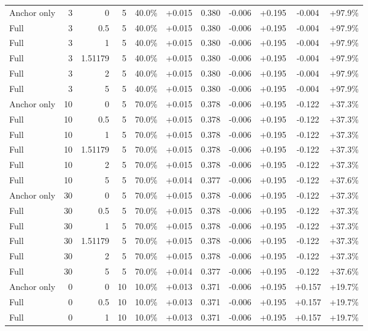 \begin{table}[htbp]
\begin{tabular}{lrrrccccccc}
Anchor only & 3 & 0 & 5 & 40.0\% & +0.015 & 0.380 & -0.006 & +0.195 & -0.004 & +97.9\% \\
Full & 3 & 0.5 & 5 & 40.0\% & +0.015 & 0.380 & -0.006 & +0.195 & -0.004 & +97.9\% \\
Full & 3 & 1 & 5 & 40.0\% & +0.015 & 0.380 & -0.006 & +0.195 & -0.004 & +97.9\% \\
Full & 3 & 1.51179 & 5 & 40.0\% & +0.015 & 0.380 & -0.006 & +0.195 & -0.004 & +97.9\% \\
Full & 3 & 2 & 5 & 40.0\% & +0.015 & 0.380 & -0.006 & +0.195 & -0.004 & +97.9\% \\
Full & 3 & 5 & 5 & 40.0\% & +0.015 & 0.380 & -0.006 & +0.195 & -0.004 & +97.9\% \\
Anchor only & 10 & 0 & 5 & 70.0\% & +0.015 & 0.378 & -0.006 & +0.195 & -0.122 & +37.3\% \\
Full & 10 & 0.5 & 5 & 70.0\% & +0.015 & 0.378 & -0.006 & +0.195 & -0.122 & +37.3\% \\
Full & 10 & 1 & 5 & 70.0\% & +0.015 & 0.378 & -0.006 & +0.195 & -0.122 & +37.3\% \\
Full & 10 & 1.51179 & 5 & 70.0\% & +0.015 & 0.378 & -0.006 & +0.195 & -0.122 & +37.3\% \\
Full & 10 & 2 & 5 & 70.0\% & +0.015 & 0.378 & -0.006 & +0.195 & -0.122 & +37.3\% \\
Full & 10 & 5 & 5 & 70.0\% & +0.014 & 0.377 & -0.006 & +0.195 & -0.122 & +37.6\% \\
Anchor only & 30 & 0 & 5 & 70.0\% & +0.015 & 0.378 & -0.006 & +0.195 & -0.122 & +37.3\% \\
Full & 30 & 0.5 & 5 & 70.0\% & +0.015 & 0.378 & -0.006 & +0.195 & -0.122 & +37.3\% \\
Full & 30 & 1 & 5 & 70.0\% & +0.015 & 0.378 & -0.006 & +0.195 & -0.122 & +37.3\% \\
Full & 30 & 1.51179 & 5 & 70.0\% & +0.015 & 0.378 & -0.006 & +0.195 & -0.122 & +37.3\% \\
Full & 30 & 2 & 5 & 70.0\% & +0.015 & 0.378 & -0.006 & +0.195 & -0.122 & +37.3\% \\
Full & 30 & 5 & 5 & 70.0\% & +0.014 & 0.377 & -0.006 & +0.195 & -0.122 & +37.6\% \\
Anchor only & 0 & 0 & 10 & 10.0\% & +0.013 & 0.371 & -0.006 & +0.195 & +0.157 & +19.7\% \\
Full & 0 & 0.5 & 10 & 10.0\% & +0.013 & 0.371 & -0.006 & +0.195 & +0.157 & +19.7\% \\
Full & 0 & 1 & 10 & 10.0\% & +0.013 & 0.371 & -0.006 & +0.195 & +0.157 & +19.7\% \\

\end{tabular}
\end{table}
